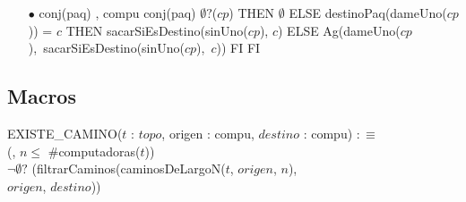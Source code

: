 \begin{itemize}
\item[$\bullet$] {conj(paq) , compu} {conj(paq)} {}
 {\IF $\emptyset?$($cp$)
											 THEN $\emptyset$
											 ELSE {\IF destinoPaq(dameUno($cp$)) = $c$
											 		THEN sacarSiEsDestino(sinUno($cp$), $c$)
											 		ELSE \mbox{Ag(dameUno($cp$), sacarSiEsDestino(sinUno($cp$), $c$))}
											 		FI}
											 FI}
\end{itemize}

\subsection*{Macros}
EXISTE\_CAMINO($t$ : $topo$, origen : compu, $destino$ : compu) $:\equiv$ \\
\hspace*{6em}(, $n \leq$ \#computadoras($t$))\\
\hspace*{8em}$\neg\emptyset?$ (filtrarCaminos(caminosDeLargoN($t$, $origen$, $n$),\\
\hspace*{17em}$origen$, $destino$))

